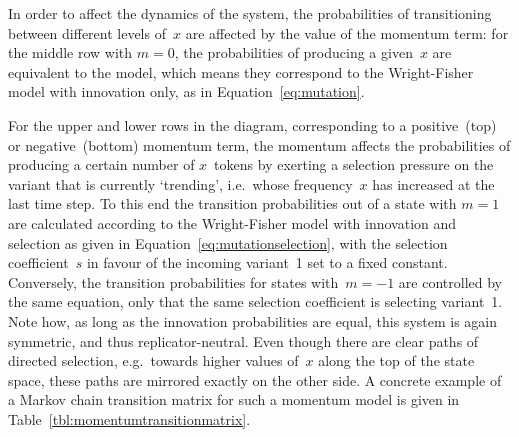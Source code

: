 In order to affect the dynamics of the system, the probabilities of transitioning between different levels of~$x$ are affected by the value of the momentum term: for the middle row with $m=0$, the probabilities of producing a given~$x$ are equivalent to the \citeauthor{Reali2009} model, which means they correspond to the Wright-Fisher model with innovation only, as in Equation~\ref{eq:mutation}.

For the upper and lower rows in the diagram, corresponding to a positive~(top)
 or negative~(bottom) momentum term, the momentum affects the probabilities of producing a certain number of $x$~tokens by exerting a selection pressure on the variant that is currently `trending', i.e.~whose frequency~$x$ has increased at the last time step. To this end the transition probabilities out of a state with $m=1$ are calculated according to the Wright-Fisher model with innovation and selection as given in Equation~\ref{eq:mutationselection}, with the selection coefficient~$s$ in favour of the incoming variant~1 set to a fixed constant. Conversely, the transition probabilities for states with~$m=-1$ are controlled by the same equation, only that the same selection coefficient is selecting variant~1. Note how, as long as the innovation probabilities are equal, this system is again symmetric, and thus replicator-neutral. Even though there are clear paths of directed selection, e.g.~towards higher values of~$x$ along the top of the state space, these paths are mirrored exactly on the other side. A concrete example of a Markov chain transition matrix for such a momentum model is given in Table~\ref{tbl:momentumtransitionmatrix}.

